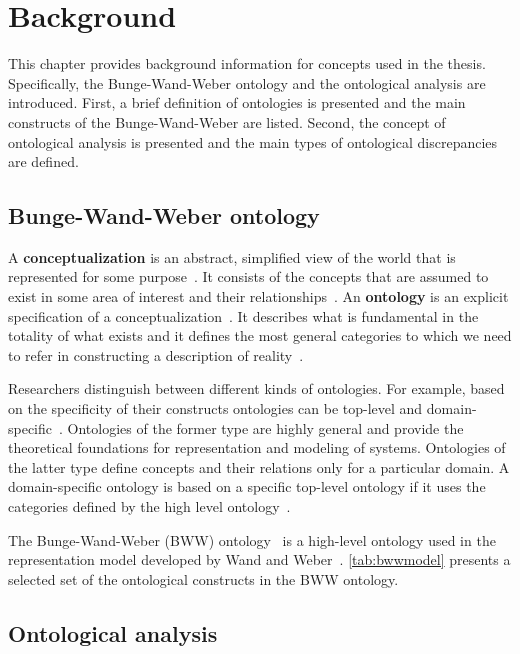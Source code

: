 \chapter{Background}
\label{sec:background}

This chapter provides background information for concepts used in the thesis.
Specifically, the Bunge-Wand-Weber ontology and the ontological analysis are
introduced. First, a brief definition of ontologies is presented and the main
constructs of the Bunge-Wand-Weber are listed. Second, the concept of
ontological analysis is presented and the main types of ontological
discrepancies are defined.

\section{Bunge-Wand-Weber ontology}


A \textbf{conceptualization} is an abstract, simplified view of the world that is represented for
some purpose~\cite{gruber1995toward}. It consists of the concepts that are assumed to exist in some
area of interest and their relationships~\cite{gruber1995toward}. An \textbf{ontology} is an
explicit specification of a conceptualization~\cite{gruber1995toward}. It describes what is
fundamental in the totality of what exists and it defines the most general categories to which we
need to refer in constructing a description of reality~\cite{milton2004top}.

Researchers distinguish between different kinds of ontologies. For example,
based on the specificity of their constructs ontologies can be top-level and
domain-specific~\cite{milton2004top}. Ontologies of the former type are
highly general and provide the theoretical foundations for representation and
modeling of systems. Ontologies of the latter type define concepts and their
relations only for a particular domain. A domain-specific ontology is based on
a specific top-level ontology if it uses the categories defined by the high
level ontology~\cite{milton2004top}.

The Bunge-Wand-Weber (BWW) ontology~\cite{wand1990ontological} is a high-level ontology used in the
representation model developed by Wand and Weber~\cite{wand1995deep}. \autoref{tab:bwwmodel}
presents a selected set of the ontological constructs in the BWW ontology.

\section{Ontological analysis}

